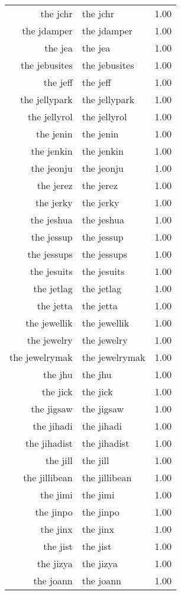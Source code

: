 \begin{table}[ht]
\begin{tabular}{rlr}
  the jchr & the jchr & 1.00 \\ 
  the jdamper & the jdamper & 1.00 \\ 
  the jea & the jea & 1.00 \\ 
  the jebusites & the jebusites & 1.00 \\ 
  the jeff & the jeff & 1.00 \\ 
  the jellypark & the jellypark & 1.00 \\ 
  the jellyrol & the jellyrol & 1.00 \\ 
  the jenin & the jenin & 1.00 \\ 
  the jenkin & the jenkin & 1.00 \\ 
  the jeonju & the jeonju & 1.00 \\ 
  the jerez & the jerez & 1.00 \\ 
  the jerky & the jerky & 1.00 \\ 
  the jeshua & the jeshua & 1.00 \\ 
  the jessup & the jessup & 1.00 \\ 
  the jessups & the jessups & 1.00 \\ 
  the jesuits & the jesuits & 1.00 \\ 
  the jetlag & the jetlag & 1.00 \\ 
  the jetta & the jetta & 1.00 \\ 
  the jewellik & the jewellik & 1.00 \\ 
  the jewelry & the jewelry & 1.00 \\ 
  the jewelrymak & the jewelrymak & 1.00 \\ 
  the jhu & the jhu & 1.00 \\ 
  the jick & the jick & 1.00 \\ 
  the jigsaw & the jigsaw & 1.00 \\ 
  the jihadi & the jihadi & 1.00 \\ 
  the jihadist & the jihadist & 1.00 \\ 
  the jill & the jill & 1.00 \\ 
  the jillibean & the jillibean & 1.00 \\ 
  the jimi & the jimi & 1.00 \\ 
  the jinpo & the jinpo & 1.00 \\ 
  the jinx & the jinx & 1.00 \\ 
  the jist & the jist & 1.00 \\ 
  the jizya & the jizya & 1.00 \\ 
  the joann & the joann & 1.00 \\ 

\end{tabular}
\end{table}
